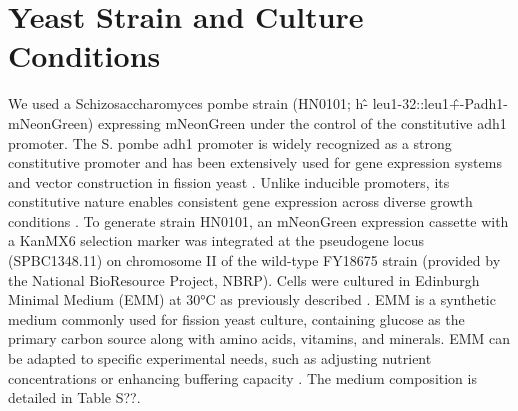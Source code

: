 \section{Yeast Strain and Culture Conditions}
We used a Schizosaccharomyces pombe strain (HN0101; h\^- leu1-32::leu1\^+-Padh1-mNeonGreen) expressing mNeonGreen under the control of the constitutive adh1 promoter. The S. pombe adh1 promoter is widely recognized as a strong constitutive promoter and has been extensively used for gene expression systems and vector construction in fission yeast \cite{verma2014high, grimm1991strong, forsburg1993comparison}. Unlike inducible promoters, its constitutive nature enables consistent gene expression across diverse growth conditions \cite{matsuyama2008series}.
To generate strain HN0101, an mNeonGreen expression cassette with a KanMX6 selection marker was integrated at the pseudogene locus (SPBC1348.11) on chromosome II of the wild-type FY18675 strain (provided by the National BioResource Project, NBRP). Cells were cultured in Edinburgh Minimal Medium (EMM) at 30°C as previously described \cite{moreno199156}. EMM is a synthetic medium commonly used for fission yeast culture, containing glucose as the primary carbon source along with amino acids, vitamins, and minerals. EMM can be adapted to specific experimental needs, such as adjusting nutrient concentrations or enhancing buffering capacity \cite{petersen2016growth}. The medium composition is detailed in Table S??.

